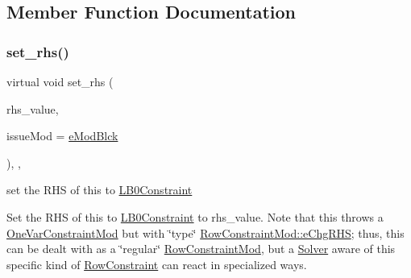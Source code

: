 \subsection{Member Function Documentation}
\mbox{\label{class_s_m_spp__di__unipi__it_1_1_l_b0_constraint_aaa68803a805a1bdf232c50aa56bb0807}} 
\subsubsection{\texorpdfstring{set\+\_\+rhs()}{set\_rhs()}}
{\footnotesize\ttfamily virtual void set\+\_\+rhs (\begin{DoxyParamCaption}\item[{\mbox{\hyperlink{class_s_m_spp__di__unipi__it_1_1_row_constraint_a34abd4b01d3a2024be5f6d13dd88779f}{c\+\_\+\+R\+H\+S\+Value}}}]{rhs\+\_\+value,  }\item[{\mbox{\hyperlink{group___modification___t_y_p_e_s_ga544246d8c462e9a2d817c2c30797968f}{c\+\_\+\+Mod\+Param}}}]{issue\+Mod = {\ttfamily \mbox{\hyperlink{group___modification___t_y_p_e_s_gga48fddcdd03a03f49b7e389ca1ed938d4a21b14b26b1c0093a0905f6fc010bad29}{e\+Mod\+Blck}}} }\end{DoxyParamCaption})\hspace{0.3cm}{\ttfamily [final]}, {\ttfamily [override]}, {\ttfamily [virtual]}}



set the R\+HS of this to \mbox{\hyperlink{class_s_m_spp__di__unipi__it_1_1_l_b0_constraint}{L\+B0\+Constraint}} 

Set the R\+HS of this to \mbox{\hyperlink{class_s_m_spp__di__unipi__it_1_1_l_b0_constraint}{L\+B0\+Constraint}} to rhs\+\_\+value. Note that this throws a \mbox{\hyperlink{class_s_m_spp__di__unipi__it_1_1_one_var_constraint_mod}{One\+Var\+Constraint\+Mod}} but with \char`\"{}type\char`\"{} \mbox{\hyperlink{class_s_m_spp__di__unipi__it_1_1_row_constraint_mod_af91e41a206e988d55a31347acd6f5d33a6c90a5d6f098c2913eef0d4058b65b1f}{Row\+Constraint\+Mod\+::e\+Chg\+R\+HS}}; thus, this can be dealt with as a \char`\"{}regular\char`\"{} \mbox{\hyperlink{class_s_m_spp__di__unipi__it_1_1_row_constraint_mod}{Row\+Constraint\+Mod}}, but a \mbox{\hyperlink{class_s_m_spp__di__unipi__it_1_1_solver}{Solver}} aware of this specific kind of \mbox{\hyperlink{class_s_m_spp__di__unipi__it_1_1_row_constraint}{Row\+Constraint}} can react in specialized ways. 

